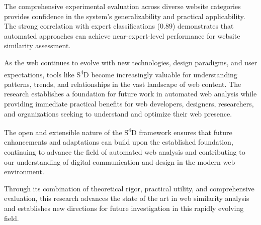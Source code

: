 The comprehensive experimental evaluation across diverse website categories provides confidence in the system's generalizability and practical applicability. The strong correlation with expert classifications (0.89) demonstrates that automated approaches can achieve near-expert-level performance for website similarity assessment.

As the web continues to evolve with new technologies, design paradigms, and user expectations, tools like S\textsuperscript{4}D become increasingly valuable for understanding patterns, trends, and relationships in the vast landscape of web content. The research establishes a foundation for future work in automated web analysis while providing immediate practical benefits for web developers, designers, researchers, and organizations seeking to understand and optimize their web presence.

The open and extensible nature of the S\textsuperscript{4}D framework ensures that future enhancements and adaptations can build upon the established foundation, continuing to advance the field of automated web analysis and contributing to our understanding of digital communication and design in the modern web environment.

Through its combination of theoretical rigor, practical utility, and comprehensive evaluation, this research advances the state of the art in web similarity analysis and establishes new directions for future investigation in this rapidly evolving field. 